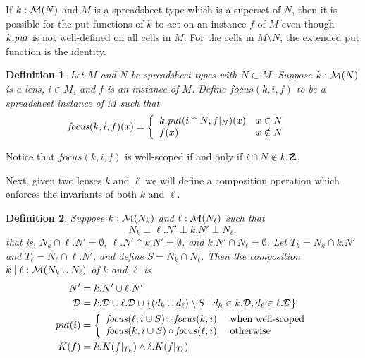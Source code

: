 \documentclass{article}
\newtheorem{definition}{Definition}
\begin{document}
\newcommand{\focus}{\mathit{focus}}
If $k : \mathcal M(N)$ and $M$ is a spreadsheet type which is a superset of $N$,
then it is possible for the put functions of $k$ to act on an instance $f$
of $M$ even though $k.\mathit{put}$ is not well-defined on all cells in $M$. 
For the cells in $M \setminus N$, the extended put function is the identity.
\begin{definition} Let $M$ and $N$ be spreadsheet types with $N \subset M$. 
    Suppose $k : \mathcal M(N)$ is a lens, $i \in M$,
    and $f$ is an instance of $M$. Define $\focus(k,i,f)$ to be a spreadsheet
    instance of $M$ such that
    \begin{align*}
        \focus(k,i,f)(x) &= \cond{
            k.\mput(i \cap N,f|_N)(x) & x \in N \\
            f(x) & x \notin N
        }
    \end{align*}
\end{definition}
Notice that $\focus(k,i,f)$ is well-scoped if and only if $i \cap N \not\in k.\danger$.

Next, given two lenses $k$ and $\ell$ we will define a composition operation
which enforces the invariants of both $k$ and $\ell$.
\begin{definition}
    Suppose $k : \mathcal M(N_k)$ and $\ell : \mathcal M(N_\ell)$ such that 
    \[N_k \perp \ell.N' \perp k.N' \perp N_\ell,\]
    that is, $N_k \cap \ell.N' = \emptyset$, $\ell.N' \cap k.N' = \emptyset$,
    and $k.N' \cap N_\ell = \emptyset$. Let $T_k = N_k \cap k.N'$ and $T_\ell = N_\ell \cap \ell.N'$,
    and define $S = N_k \cap N_\ell$.
    Then the composition $k\mid\ell : \mathcal M(N_k \cup N_\ell)$ of $k$ and $\ell$ is
    \begin{align*}
        N' &= k.N' \cup \ell.N' \\
        \danger &= k.\danger \cup \ell.\danger \cup
            \{(d_k \cup d_\ell) \setminus S
            \mid d_k \in k.\danger, d_\ell \in \ell.\danger\} \\
        \mput(i) &= \cond{
            \focus(\ell,i\cup S) \circ \focus(k,i)
                & \mbox{ when well-scoped} \\
            \focus(k,i\cup S) \circ \focus(\ell,i)
                & \mbox{ otherwise}
            } \\
        K(f) &= k.K(f|_{T_k}) \land \ell.K(f|_{T_\ell})
    \end{align*}
\end{definition}
\end{document}
